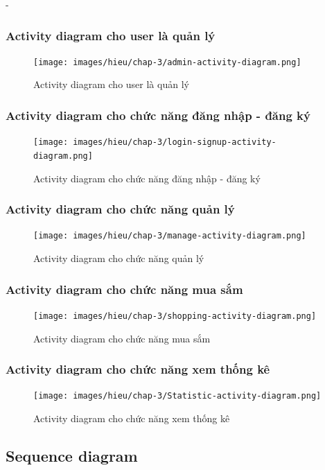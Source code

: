 \begin {list} {-}{}
\newpage
\subsubsection{Activity diagram cho user là quản lý}
\begin{figure}[H]
    \centering
    \texttt{[image: images/hieu/chap-3/admin-activity-diagram.png]}
    \caption{Activity diagram cho user là quản lý}
\end{figure}
\newpage
\subsubsection{Activity diagram cho chức năng đăng nhập - đăng ký}
\begin{figure}[H]
    \centering
    \texttt{[image: images/hieu/chap-3/login-signup-activity-diagram.png]}
    \caption{Activity diagram cho chức năng đăng nhập - đăng ký}
\end{figure}
\newpage
\subsubsection{Activity diagram cho chức năng quản lý}
\begin{figure}[H]
    \centering
    \texttt{[image: images/hieu/chap-3/manage-activity-diagram.png]}
    \caption{Activity diagram cho chức năng quản lý}
\end{figure}
\newpage
\subsubsection{Activity diagram cho chức năng mua sắm}
\begin{figure}[H]
    \centering
    \texttt{[image: images/hieu/chap-3/shopping-activity-diagram.png]}
    \caption{Activity diagram cho chức năng mua sắm}
\end{figure}
\newpage
\subsubsection{Activity diagram cho chức năng xem thống kê}
\begin{figure}[H]
    \centering
    \texttt{[image: images/hieu/chap-3/Statistic-activity-diagram.png]}
    \caption{Activity diagram cho chức năng xem thống kê}
\end{figure}
\newpage
\subsection{Sequence diagram}

\end{list}
